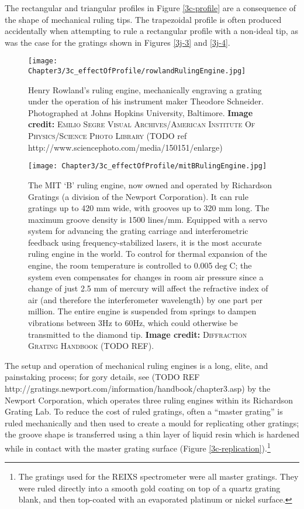 The rectangular and triangular profiles in Figure \ref{3c-profile} are a consequence of the shape of mechanical ruling tips.  The trapezoidal profile is often produced accidentally when attempting to rule a rectangular profile with a non-ideal tip, as was the case for the gratings shown in Figures \ref{3j-3} and \ref{3j-4}.

\begin{figure}[htbp] %
   \centering
   \texttt{[image: Chapter3/3c\_effectOfProfile/rowlandRulingEngine.jpg]}
   \caption{Henry Rowland's ruling engine, mechanically engraving a grating under the operation of his instrument maker Theodore Schneider.  Photographed at Johns Hopkins University, Baltimore.  \textbf{Image credit: }\textsc{Emilio Segre Visual Archives/American Institute Of Physics/Science Photo Library} (TODO ref http://www.sciencephoto.com/media/150151/enlarge)}
   \label{3c-rowlandEngine}
\end{figure}

\begin{figure}[htbp] %
   \centering
   \texttt{[image: Chapter3/3c\_effectOfProfile/mitBRulingEngine.jpg]}
   \caption{The MIT `B' ruling engine, now owned and operated by Richardson Gratings (a division of the Newport Corporation).  It can rule gratings up to 420 mm wide, with grooves up to 320 mm long.  The maximum groove density is 1500 lines/mm.  Equipped with a servo system for advancing the grating carriage and interferometric feedback using frequency-stabilized lasers, it is the most accurate ruling engine in the world.  To control for thermal expansion of the engine, the room temperature is controlled to 0.005$\deg$C; the system even compensates for changes in room air pressure since a change of just 2.5 mm of mercury will affect the refractive index of air (and therefore the interferometer wavelength) by one part per million.  The entire engine is suspended from springs to dampen vibrations between 3Hz to 60Hz, which could otherwise be transmitted to the diamond tip.  \textbf{Image credit: }\textsc{Diffraction Grating Handbook} (TODO REF).}
   \label{3c-mitBEngine}
\end{figure}

The setup and operation of mechanical ruling engines is a long, elite, and painstaking process; for gory details, see (TODO REF http://gratings.newport.com/information/handbook/chapter3.asp) by the Newport Corporation, which operates three ruling engines within its Richardson Grating Lab.  To reduce the cost of ruled gratings, often a ``master grating'' is ruled mechanically and then used to create a mould for replicating other gratings; the groove shape is transferred using a thin layer of liquid resin which is hardened while in contact with the master grating surface (Figure \ref{3c-replication}).\footnote{The gratings used for the REIXS spectrometer were all master gratings. They were ruled directly into a smooth gold coating on top of a quartz grating blank, and then top-coated with an evaporated platinum or nickel surface.}

